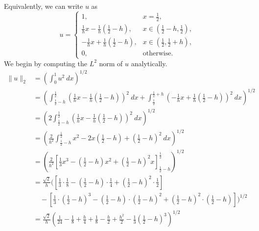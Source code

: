 \begin{solution}
    Equivalently, we can write $u$ as
    \begin{equation*}
        u =
        \begin{cases}
            1, & x = \frac{1}{2}, \\
            \frac{1}{h} x - \frac{1}{h} \left( \frac{1}{2} - h \right), & x \in \left( \frac{1}{2} - h, \frac{1}{2} \right), \\
            -\frac{1}{h} x + \frac{1}{h} \left( \frac{1}{2} - h \right), & x \in \left( \frac{1}{2}, \frac{1}{2} + h \right), \\
            0, & \text{otherwise}.
        \end{cases}
    \end{equation*}
    We begin by computing the $L^2$ norm of $u$ analytically.
    \begin{align*}
        \lVert u \rVert_2 &= \left( \int_{0}^{1} u^2 \ dx \right)^{1/2} \\
        &= \left( \int_{\frac{1}{2} - h}^{\frac{1}{2}} \left( \frac{1}{h} x - \frac{1}{h} (\frac{1}{2} - h) \right)^2 \ dx + \int_{\frac{1}{2}}^{\frac{1}{2} + h} \left( -\frac{1}{h} x + \frac{1}{h} (\frac{1}{2} - h) \right)^2 \ dx \right)^{1/2} \\
        &= \left(
            2 \int_{\frac{1}{2} - h}^{\frac{1}{2}} \left( \frac{1}{h} x - \frac{1}{h} (\frac{1}{2} - h) \right)^2 \ dx
        \right)^{1/2} \\
        &= \left(
            \frac{2}{h^2} \int_{\frac{1}{2} - h}^{\frac{1}{2}} x^2 - 2x(\frac{1}{2} - h) + (\frac{1}{2} - h)^2 \ dx
        \right)^{1/2} \\
        &= \left(
            \frac{2}{h^2} \left[ \frac{1}{3} x^3 - (\frac{1}{2} - h) x^2 + (\frac{1}{2} - h)^2 x \right]_{\frac{1}{2} - h}^{\frac{1}{2}}
        \right)^{1/2} \\
        &= \frac{\sqrt{2}}{h} \Bigg(
            \left[
                \frac{1}{3} \cdot \frac{1}{8}
                - (\frac{1}{2} - h) \cdot \frac{1}{4}
                + (\frac{1}{2} - h)^2 \cdot \frac{1}{2}
            \right] \\
            &\quad - \left[
                \frac{1}{3} \cdot \left( \frac{1}{2} - h \right)^3
                - (\frac{1}{2} - h) \cdot \left( \frac{1}{2} - h \right)^2
                + (\frac{1}{2} - h)^2 \cdot \left( \frac{1}{2} - h \right)
            \right]
        \Bigg)^{1/2} \\
        &= \frac{\sqrt{2}}{h}\left(
            \frac{1}{24}
            - \frac{1}{8} + \frac{h}{4}
            + \frac{1}{8} - \frac{h}{2} + \frac{h^2}{2}
            - \frac{1}{3} \left( \frac{1}{2} - h \right)^3
        \right)^{1/2}
    \end{align*}


\end{solution}
